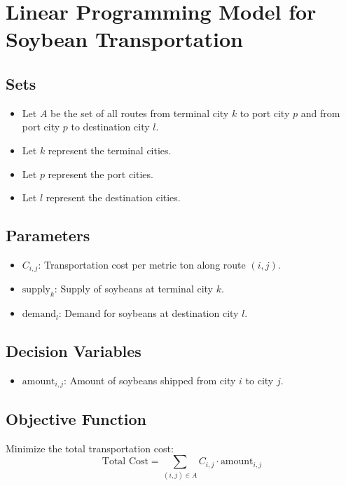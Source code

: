 \documentclass{article}
\begin{document}
\section*{Linear Programming Model for Soybean Transportation}

\subsection*{Sets}
\begin{itemize}
    \item Let \( A \) be the set of all routes from terminal city \( k \) to port city \( p \) and from port city \( p \) to destination city \( l \).
    \item Let \( k \) represent the terminal cities.
    \item Let \( p \) represent the port cities.
    \item Let \( l \) represent the destination cities.
\end{itemize}

\subsection*{Parameters}
\begin{itemize}
    \item \( C_{i,j} \): Transportation cost per metric ton along route \( (i,j) \).
    \item \( \text{supply}_k \): Supply of soybeans at terminal city \( k \).
    \item \( \text{demand}_l \): Demand for soybeans at destination city \( l \).
\end{itemize}

\subsection*{Decision Variables}
\begin{itemize}
    \item \( \text{amount}_{i,j} \): Amount of soybeans shipped from city \( i \) to city \( j \).
\end{itemize}

\subsection*{Objective Function}
Minimize the total transportation cost:
\[
\text{Total Cost} = \sum_{(i,j) \in A} C_{i,j} \cdot \text{amount}_{i,j}
\]
\end{document}
